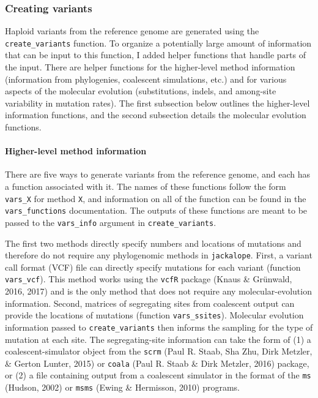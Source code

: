 \documentclass[12pt,]{article}
\let\oldparagraph\paragraph
\renewcommand{\paragraph}[1]{\oldparagraph{#1}\mbox{}}
\begin{document}
\hypertarget{creating-variants}{%
\subsubsection{Creating variants}\label{creating-variants}}

Haploid variants from the reference genome are generated using the
\texttt{create\_variants} function.
To organize a potentially large amount of information that can be input to this function,
I added helper functions that handle parts of the input.
There are helper functions for the higher-level method information
(information from phylogenies, coalescent simulations, etc.) and
for various aspects of the molecular evolution (substitutions, indels, and among-site
variability in mutation rates).
The first subsection below outlines the higher-level information functions, and
the second subsection details the molecular evolution functions.

\hypertarget{higher-level-method-information}{%
\paragraph{Higher-level method information}\label{higher-level-method-information}}

There are five ways to generate variants from the reference genome, and
each has a function associated with it.
The names of these functions follow the form \texttt{vars\_X} for method \texttt{X},
and information on all of the function can be found in the \texttt{vars\_functions} documentation.
The outputs of these functions are meant to be passed to the \texttt{vars\_info} argument
in \texttt{create\_variants}.

The first two methods directly specify numbers and locations of mutations and
therefore do not require any phylogenomic methods in \texttt{jackalope}.
First, a variant call format (VCF) file can directly specify mutations for each
variant (function \texttt{vars\_vcf}).
This method works using the \texttt{vcfR} package (Knaus \& Grünwald, 2016, 2017) and
is the only method that does not require any molecular-evolution information.
Second, matrices of segregating sites from coalescent output can provide the locations
of mutations (function \texttt{vars\_ssites}).
Molecular evolution information passed to \texttt{create\_variants} then informs the sampling
for the type of mutation at each site.
The segregating-site information can take the form of
(1) a coalescent-simulator object from the \texttt{scrm} (Paul R. Staab, Sha Zhu, Dirk Metzler, \& Gerton Lunter, 2015) or
\texttt{coala} (Paul R. Staab \& Dirk Metzler, 2016) package, or
(2) a file containing output from a coalescent simulator in the format of the
\texttt{ms} (Hudson, 2002) or
\texttt{msms} (Ewing \& Hermisson, 2010) programs.
\end{document}
